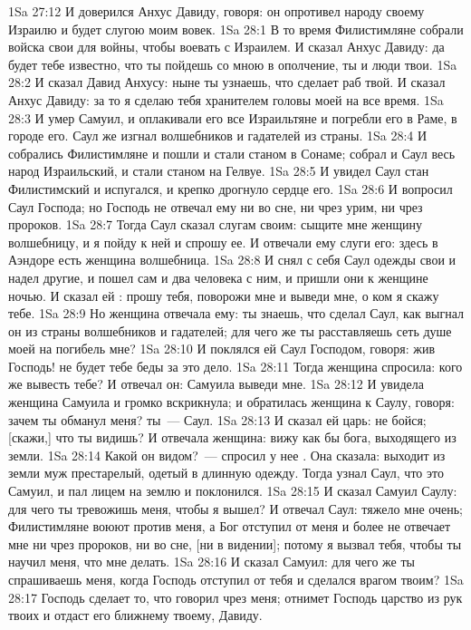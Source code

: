 \vs 1Sa 27:12 И доверился Анхус Давиду, говоря: он опротивел народу своему Израилю и будет слугою моим вовек.
\vs 1Sa 28:1 В то время Филистимляне собрали войска свои для войны, чтобы воевать с Израилем. И сказал Анхус Давиду: да будет тебе известно, что ты пойдешь со мною в ополчение, ты и люди твои.
\vs 1Sa 28:2 И сказал Давид Анхусу: ныне ты узнаешь, что сделает раб твой. И сказал Анхус Давиду: за то я сделаю тебя хранителем головы моей на все время.
\rsbpar\vs 1Sa 28:3 И умер Самуил, и оплакивали его все Израильтяне и погребли его в Раме, в городе его. Саул же изгнал волшебников и гадателей из страны.
\rsbpar\vs 1Sa 28:4 И собрались Филистимляне и пошли и стали станом в Сонаме; собрал и Саул весь народ Израильский, и стали станом на Гелвуе.
\vs 1Sa 28:5 И увидел Саул стан Филистимский и испугался, и крепко дрогнуло сердце его.
\vs 1Sa 28:6 И вопросил Саул Господа; но Господь не отвечал ему ни во сне, ни чрез урим, ни чрез пророков.
\vs 1Sa 28:7 Тогда Саул сказал слугам своим: сыщите мне женщину волшебницу, и я пойду к ней и спрошу ее. И отвечали ему слуги его: здесь в Аэндоре есть женщина волшебница.
\vs 1Sa 28:8 И снял с себя Саул одежды свои и надел другие, и пошел сам и два человека с ним, и пришли они к женщине ночью. И сказал ей : прошу тебя, поворожи мне и выведи мне, о ком я скажу тебе.
\vs 1Sa 28:9 Но женщина отвечала ему: ты знаешь, что сделал Саул, как выгнал он из страны волшебников и гадателей; для чего же ты расставляешь сеть душе моей на погибель мне?
\vs 1Sa 28:10 И поклялся ей Саул Господом, говоря: жив Господь! не будет тебе беды за это дело.
\vs 1Sa 28:11 Тогда женщина спросила: кого же вывесть тебе? И отвечал он: Самуила выведи мне.
\vs 1Sa 28:12 И увидела женщина Самуила и громко вскрикнула; и обратилась женщина к Саулу, говоря: зачем ты обманул меня? ты~--- Саул.
\vs 1Sa 28:13 И сказал ей царь: не бойся; [скажи,] что ты видишь? И отвечала женщина: вижу как бы бога, выходящего из земли.
\vs 1Sa 28:14 Какой он видом?~--- спросил у нее . Она сказала: выходит из земли муж престарелый, одетый в длинную одежду. Тогда узнал Саул, что это Самуил, и пал лицем на землю и поклонился.
\vs 1Sa 28:15 И сказал Самуил Саулу: для чего ты тревожишь меня, чтобы я вышел? И отвечал Саул: тяжело мне очень; Филистимляне воюют против меня, а Бог отступил от меня и более не отвечает мне ни чрез пророков, ни во сне, [ни в видении]; потому я вызвал тебя, чтобы ты научил меня, что мне делать.
\vs 1Sa 28:16 И сказал Самуил: для чего же ты спрашиваешь меня, когда Господь отступил от тебя и сделался врагом твоим?
\vs 1Sa 28:17 Господь сделает то, что говорил чрез меня; отнимет Господь царство из рук твоих и отдаст его ближнему твоему, Давиду.
